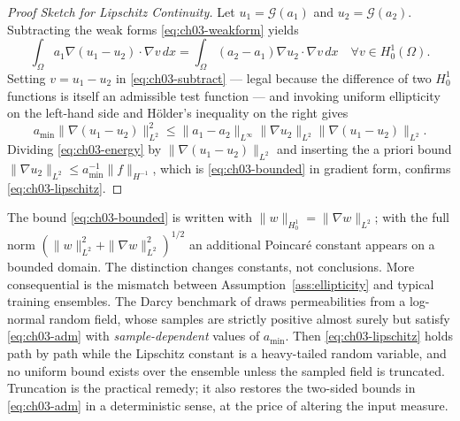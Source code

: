 \begin{proof}[Proof Sketch for Lipschitz Continuity]
Let $u_1 = \mathcal{G}(a_1)$ and $u_2 = \mathcal{G}(a_2)$. Subtracting the weak
forms \eqref{eq:ch03-weakform} yields
\begin{equation}
  \int_\Omega a_1 \nabla (u_1 - u_2) \cdot \nabla v \, dx = \int_\Omega (a_2 - a_1) \nabla u_2 \cdot \nabla v \, dx \quad \forall v \in H^1_0(\Omega).
  \label{eq:ch03-subtract}
\end{equation}
Setting $v = u_1 - u_2$ in \eqref{eq:ch03-subtract} --- legal because the
difference of two $H^1_0$
functions is itself an admissible test function --- and invoking uniform
ellipticity on the left-hand side and H{\"o}lder's inequality on the right gives
\begin{equation}
  a_{\min} \|\nabla(u_1 - u_2)\|_{L^2}^2 \le \|a_1 - a_2\|_{L^\infty} \|\nabla u_2\|_{L^2} \|\nabla(u_1 - u_2)\|_{L^2}.
  \label{eq:ch03-energy}
\end{equation}
Dividing \eqref{eq:ch03-energy} by $\|\nabla(u_1 - u_2)\|_{L^2}$ and inserting
the a priori bound $\|\nabla u_2\|_{L^2} \le a_{\min}^{-1} \|f\|_{H^{-1}}$,
which is \eqref{eq:ch03-bounded} in gradient form, confirms
\eqref{eq:ch03-lipschitz}.
\end{proof}

\begin{remark}
The bound \eqref{eq:ch03-bounded} is written
with $\|w\|_{H^1_0} = \|\nabla w\|_{L^2}$; with the full norm
$(\|w\|_{L^2}^2 + \|\nabla w\|_{L^2}^2)^{1/2}$ an additional Poincar{\'e}
constant appears on a bounded domain. The distinction changes constants, not
conclusions. More consequential is the mismatch between
Assumption~\ref{ass:ellipticity} and typical training ensembles. The Darcy
benchmark of  draws permeabilities from a log-normal random
field, whose samples are strictly positive almost surely but satisfy
\eqref{eq:ch03-adm} with \emph{sample-dependent} values of $a_{\min}$. Then
\eqref{eq:ch03-lipschitz} holds path by path while the Lipschitz constant is a
heavy-tailed random variable, and no uniform bound exists over the ensemble
unless the sampled field is truncated. Truncation is the practical remedy; it
also restores the two-sided bounds in \eqref{eq:ch03-adm} in a deterministic
sense, at the price of altering the input measure.
\end{remark}

